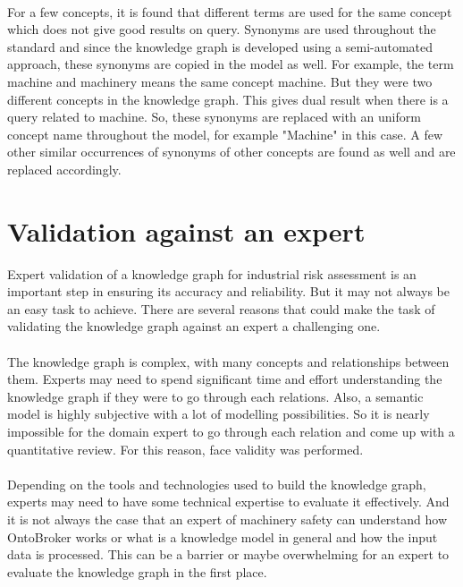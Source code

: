 \paragraph{} For a few concepts, it is found that different terms are used for the same concept which does not give good results on query. Synonyms are used throughout the standard and since the knowledge graph is developed using a semi-automated approach, these synonyms are copied in the model as well. For example, the term machine and machinery means the same concept machine. But they were two different concepts in the knowledge graph. This gives dual result when there is a query related to machine. So, these synonyms are replaced with an uniform concept name throughout the model, for example "Machine" in this case. A few other similar occurrences of synonyms of other concepts are found as well and are replaced accordingly.

\section{Validation against an expert} \label{expert_validity}
Expert validation of a knowledge graph for industrial risk assessment is an important step in ensuring its accuracy and reliability. But it may not always be an easy task to achieve. There are several reasons that could make the task of validating the knowledge graph against an expert a challenging one.

\paragraph{} The knowledge graph is complex, with many concepts and relationships between them. Experts may need to spend significant time and effort understanding the knowledge graph if they were to go through each relations. Also, a semantic model is highly subjective with a lot of modelling possibilities. So it is nearly impossible for the domain expert to go through each relation and come up with a quantitative review. For this reason, face validity was performed. 

\paragraph{} Depending on the tools and technologies used to build the knowledge graph, experts may need to have some technical expertise to evaluate it effectively. And it is not always the case that an expert of machinery safety can understand how OntoBroker works or what is a knowledge model in general and how the input data is processed. This can be a barrier or maybe overwhelming for an expert to evaluate the knowledge graph in the first place.

